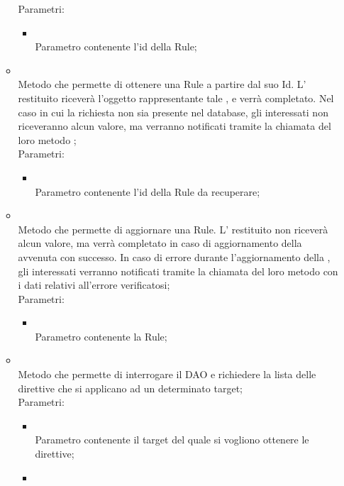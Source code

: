 \begin{itemize}
\begin{itemize}
		Parametri:
		\begin{itemize}
			\item {} \\
			Parametro contenente l'id della Rule;
		\end{itemize}
		\item[]  \\
		Metodo che permette di ottenere una Rule a partire dal suo Id. L' restituito riceverà l'oggetto rappresentante tale , e verrà completato. Nel caso in cui la  richiesta non sia presente nel database, gli  interessati non riceveranno alcun valore, ma verranno notificati tramite la chiamata del loro metodo ;\\
		Parametri:
		\begin{itemize}
			\item {} \\
			Parametro contenente l'id della Rule da recuperare;
		\end{itemize}
		\item[]  \\
		Metodo che permette di aggiornare una Rule.  L' restituito non riceverà alcun valore, ma verrà completato in caso di aggiornamento della  avvenuta con successo. In caso di errore durante l'aggiornamento della , gli  interessati verranno notificati tramite la chiamata del loro metodo  con i dati relativi all'errore verificatosi;\\
		Parametri:
		\begin{itemize}
			\item {} \\
			Parametro contenente la Rule;
		\end{itemize}
		\item[]  \\
		Metodo che permette di interrogare il DAO e richiedere la lista delle direttive che si applicano ad un determinato target;\\
		Parametri:
		\begin{itemize}
			\item {} \\
			Parametro contenente il target del quale si vogliono ottenere le direttive;
			\item {} \\

\end{itemize}
\end{itemize}
\end{itemize}
